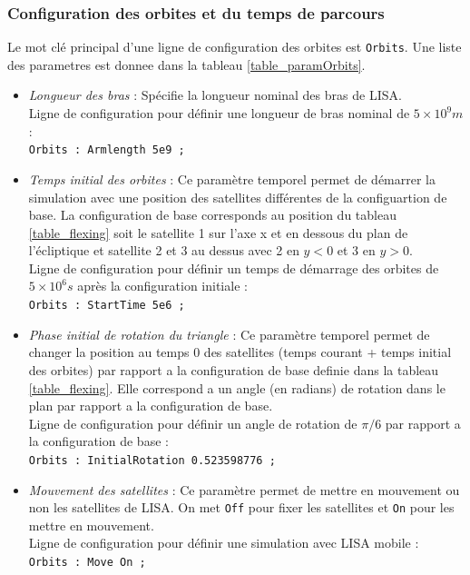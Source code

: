 \documentclass[a4paper,english,12pt]{article}
\begin{document}
\subsubsection{Configuration des orbites et du temps de parcours}
\label{SSSConfigOrbits}
Le mot cl\'e principal d'une ligne de configuration des orbites est  \texttt{Orbits}. Une liste des parametres est donnee dans la tableau \ref{table_paramOrbits}.
\begin{itemize}

\item { \it Longueur des bras } : Sp\'ecifie la longueur nominal des bras de LISA.\\
Ligne de configuration pour d\'efinir une longueur de bras nominal de $5 \times 10^{9} m$ : \\
\hphantom{aaaaa}\texttt{Orbits : Armlength 5e9 ;}  \\

\item { \it Temps initial des orbites } : Ce param\`etre temporel permet de d\'emarrer la simulation avec une position des satellites diff\'erentes de la configuartion de base. La configuration de base corresponds au position du tableau  \ref{table_flexing} soit le satellite 1 sur l'axe x et en dessous du plan de l'\'ecliptique et satellite 2 et 3 au dessus avec 2 en $y < 0$ et 3 en $y > 0$.\\
Ligne de configuration pour d\'efinir un temps de d\'emarrage des orbites de $5 \times 10^{6} s$ apr\`es la configuration initiale : \\
\hphantom{aaaaa}\texttt{Orbits : StartTime 5e6 ;}  \\

\item { \it Phase initial de rotation du triangle } : Ce param\`etre temporel permet de changer la position au temps 0 des satellites (temps courant  + temps initial des orbites) par rapport a la configuration de base definie dans la tableau \ref{table_flexing}. Elle correspond a un angle (en radians) de rotation dans le plan par rapport a la configuration de base. \\
Ligne de configuration pour d\'efinir un angle de rotation de $ \pi / 6$ par rapport a la configuration de base : \\
\hphantom{aaaaa}\texttt{Orbits : InitialRotation 0.523598776 ;}  \\

\item { \it Mouvement des satellites } : Ce param\`etre permet de mettre en mouvement ou non les satellites de LISA. On met \texttt{Off} pour fixer les satellites et \texttt{On} pour les mettre en mouvement.\\
Ligne de configuration pour d\'efinir une simulation avec LISA mobile : \\
\hphantom{aaaaa}\texttt{Orbits : Move On ;}  \\


\end{itemize}
\end{document}
